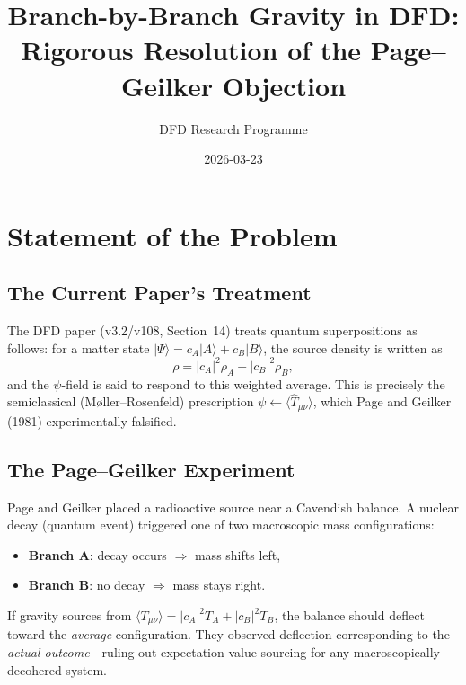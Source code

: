 \documentclass[11pt,a4paper]{article}
\title{Branch-by-Branch Gravity in DFD:\\
Rigorous Resolution of the Page--Geilker Objection}
\author{DFD Research Programme}
\date{2026-03-23}
\begin{document}
\maketitle
\tableofcontents
\newpage

\section{Statement of the Problem}
\label{sec:problem}

\subsection{The Current Paper's Treatment}

The DFD paper (v3.2/v108, Section~14) treats quantum superpositions as follows:
for a matter state $|\Psi\rangle = c_A|A\rangle + c_B|B\rangle$, the source
density is written as
\begin{equation}\label{eq:paper-rho}
\rho = |c_A|^2\rho_A + |c_B|^2\rho_B,
\end{equation}
and the $\psi$-field is said to respond to this weighted average. This is
precisely the semiclassical (M{\o}ller--Rosenfeld) prescription
$\psi \leftarrow \langle\hat{T}_{\mu\nu}\rangle$, which Page and Geilker
(1981) experimentally falsified.

\subsection{The Page--Geilker Experiment}

Page and Geilker placed a radioactive source near a Cavendish balance. A
nuclear decay (quantum event) triggered one of two macroscopic mass
configurations:
\begin{itemize}
\item \textbf{Branch A}: decay occurs $\Rightarrow$ mass shifts left,
\item \textbf{Branch B}: no decay $\Rightarrow$ mass stays right.
\end{itemize}

If gravity sources from $\langle T_{\mu\nu}\rangle = |c_A|^2 T_A +
|c_B|^2 T_B$, the balance should deflect toward the \emph{average}
configuration. They observed deflection corresponding to the \emph{actual
outcome}---ruling out expectation-value sourcing for any macroscopically
decohered system.
\end{document}
